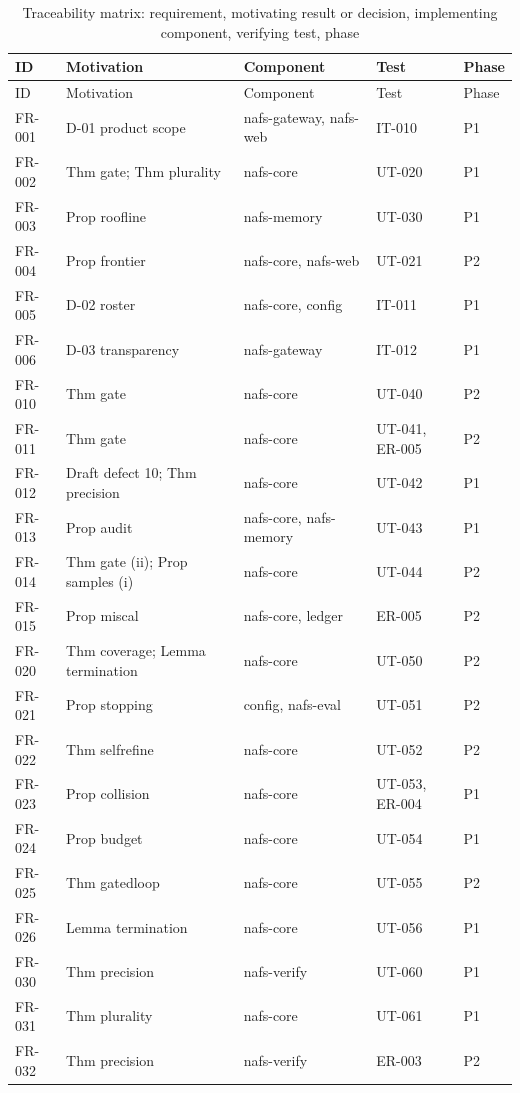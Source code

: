 \begin{longtable}{@{}p{1.45cm}p{4.4cm}p{4.2cm}p{3.1cm}p{1.1cm}@{}}
\caption{Traceability matrix: requirement, motivating result or decision, implementing component, verifying test, phase}\\
\toprule ID & Motivation & Component & Test & Phase\\\midrule\endfirsthead
\toprule ID & Motivation & Component & Test & Phase\\\midrule\endhead
\bottomrule\endfoot
FR-001 & D-01 product scope & nafs-gateway, nafs-web & IT-010 & P1\\
FR-002 & Thm gate; Thm plurality & nafs-core & UT-020 & P1\\
FR-003 & Prop roofline & nafs-memory & UT-030 & P1\\
FR-004 & Prop frontier & nafs-core, nafs-web & UT-021 & P2\\
FR-005 & D-02 roster & nafs-core, config & IT-011 & P1\\
FR-006 & D-03 transparency & nafs-gateway & IT-012 & P1\\
FR-010 & Thm gate & nafs-core & UT-040 & P2\\
FR-011 & Thm gate & nafs-core & UT-041, ER-005 & P2\\
FR-012 & Draft defect 10; Thm precision & nafs-core & UT-042 & P1\\
FR-013 & Prop audit & nafs-core, nafs-memory & UT-043 & P1\\
FR-014 & Thm gate (ii); Prop samples (i) & nafs-core & UT-044 & P2\\
FR-015 & Prop miscal & nafs-core, ledger & ER-005 & P2\\
FR-020 & Thm coverage; Lemma termination & nafs-core & UT-050 & P2\\
FR-021 & Prop stopping & config, nafs-eval & UT-051 & P2\\
FR-022 & Thm selfrefine & nafs-core & UT-052 & P2\\
FR-023 & Prop collision & nafs-core & UT-053, ER-004 & P1\\
FR-024 & Prop budget & nafs-core & UT-054 & P1\\
FR-025 & Thm gatedloop & nafs-core & UT-055 & P2\\
FR-026 & Lemma termination & nafs-core & UT-056 & P1\\
FR-030 & Thm precision & nafs-verify & UT-060 & P1\\
FR-031 & Thm plurality & nafs-core & UT-061 & P1\\
FR-032 & Thm precision & nafs-verify & ER-003 & P2\\

\end{longtable}
